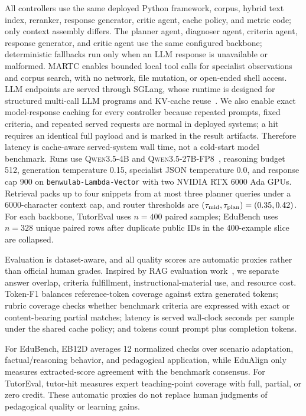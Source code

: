 \documentclass[letterpaper, 10 pt, conference]{ieeeconf}
\begin{document}
All controllers use the same deployed Python framework, corpus, hybrid text index, reranker, response generator, critic agent, cache policy, and metric code; only context assembly differs. The planner agent, diagnoser agent, criteria agent, response generator, and critic agent use the same configured backbone; deterministic fallbacks run only when an LLM response is unavailable or malformed. MARTC enables bounded local tool calls for specialist observations and corpus search, with no network, file mutation, or open-ended shell access. LLM endpoints are served through SGLang, whose runtime is designed for structured multi-call LLM programs and KV-cache reuse~\cite{zheng2024sglang}. We also enable exact model-response caching for every controller because repeated prompts, fixed criteria, and repeated served requests are normal in deployed systems; a hit requires an identical full payload and is marked in the result artifacts. Therefore latency is cache-aware served-system wall time, not a cold-start model benchmark. Runs use \textsc{Qwen3.5-4B} and \textsc{Qwen3.5-27B-FP8}~\cite{qwen35}, reasoning budget 512, generation temperature 0.15, specialist JSON temperature 0.0, and response cap 900 on \texttt{benwulab-Lambda-Vector} with two NVIDIA RTX 6000 Ada GPUs. Retrieval packs up to four snippets from at most three planner queries under a 6000-character context cap, and router thresholds are $(\tau_{\rm mid},\tau_{\rm plan})=(0.35,0.42)$. For each backbone, TutorEval uses $n{=}400$ paired samples; EduBench uses $n{=}328$ unique paired rows after duplicate public IDs in the 400-example slice are collapsed.

Evaluation is dataset-aware, and all quality scores are automatic proxies rather than official human grades. Inspired by RAG evaluation work~\cite{ru2024ragchecker}, we separate answer overlap, criteria fulfillment, instructional-material use, and resource cost. Token-F1 balances reference-token coverage against extra generated tokens; rubric coverage checks whether benchmark criteria are expressed with exact or content-bearing partial matches; latency is served wall-clock seconds per sample under the shared cache policy; and tokens count prompt plus completion tokens.

For EduBench, EB12D averages 12 normalized checks over scenario adaptation, factual/reasoning behavior, and pedagogical application, while EduAlign only measures extracted-score agreement with the benchmark consensus. For TutorEval, tutor-hit measures expert teaching-point coverage with full, partial, or zero credit. These automatic proxies do not replace human judgments of pedagogical quality or learning gains.
\end{document}
